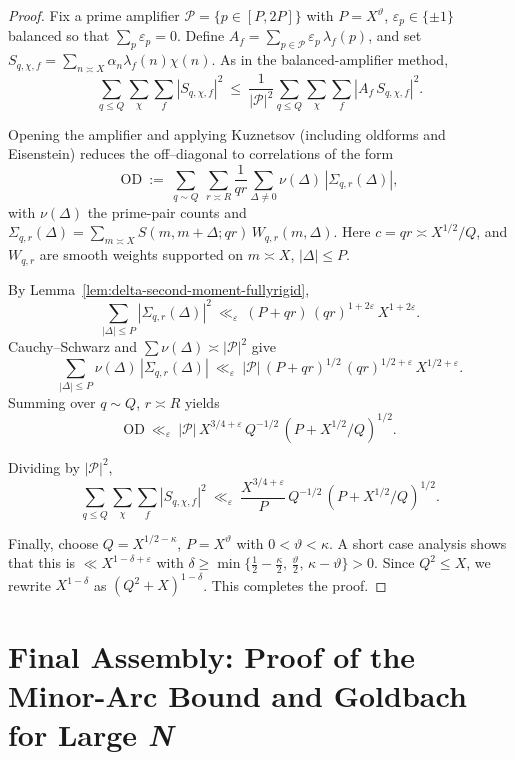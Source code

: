 \documentclass[11pt]{article}
\theoremstyle{definition}
\theoremstyle{remark}
\numberwithin{equation}{part}
\begin{document}
\begin{proof}
	Fix a prime amplifier $\mathcal P=\{p\in[P,2P]\}$ with $P=X^\vartheta$, $\varepsilon_p\in\{\pm1\}$ balanced so that $\sum_p\varepsilon_p=0$.
	Define $A_f=\sum_{p\in\mathcal P}\varepsilon_p\,\lambda_f(p)$, and set
	$S_{q,\chi,f}=\sum_{n\asymp X}\alpha_n\lambda_f(n)\chi(n)$.
	As in the balanced-amplifier method,
	\[
		\sum_{q\le Q}\sum_{\chi}\sum_f |S_{q,\chi,f}|^2
		\ \le\ \frac{1}{|\mathcal P|^2}\sum_{q\le Q}\sum_{\chi}\sum_f |A_f\,S_{q,\chi,f}|^2.
	\]

	Opening the amplifier and applying Kuznetsov (including oldforms and Eisenstein) reduces the off--diagonal to correlations of the form
	\[
		\mathrm{OD}\ :=\ \sum_{q\sim Q}\ \sum_{r\asymp R}\frac{1}{qr}\sum_{\Delta\ne0}\nu(\Delta)\,|\Sigma_{q,r}(\Delta)|,
	\]
	with $\nu(\Delta)$ the prime-pair counts and
	$\Sigma_{q,r}(\Delta)=\sum_{m\asymp X} S(m,m+\Delta;qr)\,W_{q,r}(m,\Delta)$.
	Here $c=qr\asymp X^{1/2}/Q$, and $W_{q,r}$ are smooth weights supported on $m\asymp X$, $|\Delta|\le P$.

	By Lemma~\ref{lem:delta-second-moment-fullyrigid},
	\[
		\sum_{|\Delta|\le P}|\Sigma_{q,r}(\Delta)|^2
		\ \ll_\varepsilon\ (P+qr)\,(qr)^{1+2\varepsilon}\,X^{1+2\varepsilon}.
	\]
	Cauchy--Schwarz and $\sum\nu(\Delta)\asymp |\mathcal P|^2$ give
	\[
		\sum_{|\Delta|\le P}\nu(\Delta)\,|\Sigma_{q,r}(\Delta)|
		\ \ll_\varepsilon\
		|\mathcal P|\,(P+qr)^{1/2}\,(qr)^{1/2+\varepsilon}\,X^{1/2+\varepsilon}.
	\]
	Summing over $q\sim Q$, $r\asymp R$ yields
	\[
		\mathrm{OD}\ \ll_\varepsilon\
		|\mathcal P|\,X^{3/4+\varepsilon}\,Q^{-1/2}\,(P+X^{1/2}/Q)^{1/2}.
	\]

	Dividing by $|\mathcal P|^2$,
	\[
		\sum_{q\le Q}\sum_{\chi}\sum_f |S_{q,\chi,f}|^2
		\ \ll_\varepsilon\ \frac{X^{3/4+\varepsilon}}{P}\,Q^{-1/2}\,(P+X^{1/2}/Q)^{1/2}.
	\]

	Finally, choose $Q=X^{1/2-\kappa}$, $P=X^\vartheta$ with $0<\vartheta<\kappa$.
	A short case analysis shows that this is $\ll X^{1-\delta+\varepsilon}$ with $\delta\ge\min\{\tfrac12-\tfrac{\kappa}{2},\,\tfrac{\vartheta}{2},\,\kappa-\vartheta\}>0$.
	Since $Q^2\le X$, we rewrite $X^{1-\delta}$ as $(Q^2+X)^{1-\delta}$.
	This completes the proof.
\end{proof}

\part{Final Assembly: Proof of the Minor-Arc Bound and Goldbach for Large \textit{N}}
\end{document}
